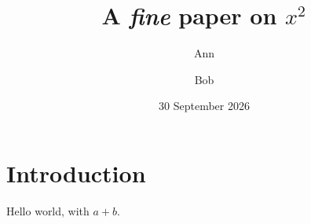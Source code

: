 \documentclass{article}
\begin{document}
\title{A \emph{fine} paper on \(x^2\)}
\author{Ann \and Bob}
\date{30 September 2026}
\maketitle
\flmHeading[toc=true]
\section{Introduction}{\flmLabels{}}

Hello world, with \(a+b\).
\end{document}
